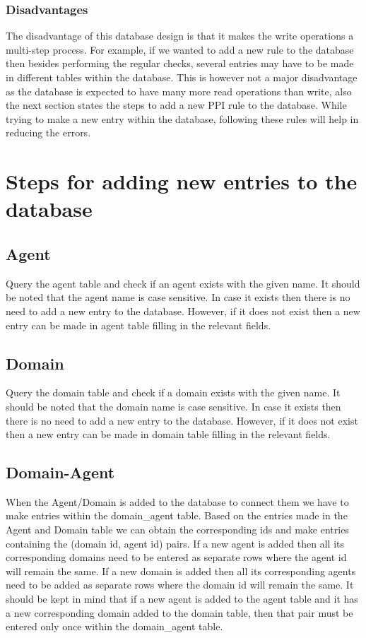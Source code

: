 \documentclass[msc,deptreport,ai]{infthesis}      %
\begin{document}
 \subsubsection{Disadvantages}
 The disadvantage of this database design is that it makes the write operations a multi-step process. For example, if we wanted to add a new rule to the database then besides performing the regular checks, several entries may have to be made in different tables within the database. This is however not a major disadvantage as the database is expected to have many more read operations than write, also the next section states the steps to add a new PPI rule to the database. While trying to make a new entry within the database, following these rules will help in reducing the errors.
\section{Steps for adding new entries to the database}
\subsection{Agent}
	Query the agent table and check if an agent exists with the given name. It should be noted that the agent name is case sensitive. In case it exists then there is no need to add a new entry to the database. However, if it does not exist then a new entry can be made in agent table filling in the relevant fields. 
\subsection{Domain}
	Query the domain table and check if a domain exists with the given name. It should be noted that the domain name is case sensitive. In case it exists then there is no need to add a new entry to the database. However, if it does not exist then a new entry can be made in domain table filling in the relevant fields. 
\subsection{Domain-Agent}
	When the Agent/Domain is added to the database to connect them we have to make entries within the domain\_agent table. Based on the entries made in the Agent and Domain table we can obtain the corresponding ids and make entries containing the (domain id, agent id) pairs. If a new agent is added then all its corresponding domains need to be entered as separate rows where the agent id will remain the same. If a new domain is added then all its corresponding agents need to be added as separate rows where the domain id will remain the same. 	
	It should be kept in mind that if a new agent is added to the agent table and it has a new corresponding domain added to the domain table, then that pair must be entered only once within the domain\_agent table.	
\end{document}
